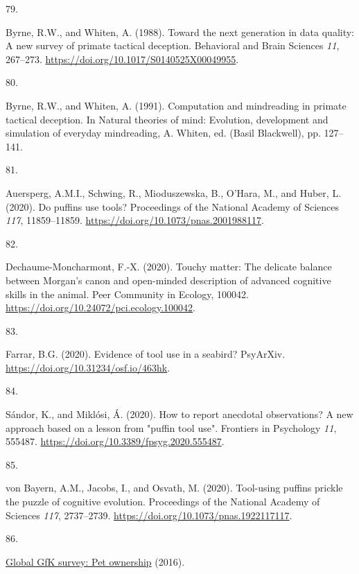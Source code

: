 \documentclass[
  man, donotrepeattitle,floatsintext]{apa6}
\newlength{\cslhangindent}
\newlength{\csllabelwidth}
\newlength{\cslentryspacingunit} %
\newenvironment{CSLReferences}[2] %
 {%
  \setlength{\parindent}{0pt}
  \ifodd #1
  \let\oldpar\par
  \def\par{\hangindent=\cslhangindent\oldpar}
  \fi
  \setlength{\parskip}{#2\cslentryspacingunit}
 }%
 {}
\newcommand{\CSLLeftMargin}[1]{\parbox[t]{\csllabelwidth}{#1}}
\newcommand{\CSLRightInline}[1]{\parbox[t]{\linewidth - \csllabelwidth}{#1}\break}
\begin{document}
\begin{CSLReferences}{0}{0}
\leavevmode{}%
\CSLLeftMargin{79. }%
\CSLRightInline{Byrne, R.W., and Whiten, A. (1988). Toward the next generation in data quality: A new survey of primate tactical deception. Behavioral and Brain Sciences \emph{11}, 267--273. \url{https://doi.org/10.1017/S0140525X00049955}.}

\leavevmode{}%
\CSLLeftMargin{80. }%
\CSLRightInline{Byrne, R.W., and Whiten, A. (1991). Computation and mindreading in primate tactical deception. In Natural theories of mind: Evolution, development and simulation of everyday mindreading, A. Whiten, ed. (Basil Blackwell), pp. 127--141.}

\leavevmode{}%
\CSLLeftMargin{81. }%
\CSLRightInline{Auersperg, A.M.I., Schwing, R., Mioduszewska, B., O'Hara, M., and Huber, L. (2020). Do puffins use tools? Proceedings of the National Academy of Sciences \emph{117}, 11859--11859. \url{https://doi.org/10.1073/pnas.2001988117}.}

\leavevmode{}%
\CSLLeftMargin{82. }%
\CSLRightInline{Dechaume-Moncharmont, F.-X. (2020). Touchy matter: The delicate balance between {M}organ's canon and open-minded description of advanced cognitive skills in the animal. Peer Community in Ecology, 100042. \url{https://doi.org/10.24072/pci.ecology.100042}.}

\leavevmode{}%
\CSLLeftMargin{83. }%
\CSLRightInline{Farrar, B.G. (2020). Evidence of tool use in a seabird? PsyArXiv. \url{https://doi.org/10.31234/osf.io/463hk}.}

\leavevmode{}%
\CSLLeftMargin{84. }%
\CSLRightInline{Sándor, K., and Miklósi, Á. (2020). How to report anecdotal observations? A new approach based on a lesson from "puffin tool use". Frontiers in Psychology \emph{11}, 555487. \url{https://doi.org/10.3389/fpsyg.2020.555487}.}

\leavevmode{}%
\CSLLeftMargin{85. }%
\CSLRightInline{von Bayern, A.M., Jacobs, I., and Osvath, M. (2020). Tool-using puffins prickle the puzzle of cognitive evolution. Proceedings of the National Academy of Sciences \emph{117}, 2737--2739. \url{https://doi.org/10.1073/pnas.1922117117}.}

\leavevmode{}%
\CSLLeftMargin{86. }%
\CSLRightInline{\href{http://www.gfk.com/global-studies/global-studies-pet-ownership}{Global GfK survey: Pet ownership} (2016).}


\end{CSLReferences}
\end{document}
